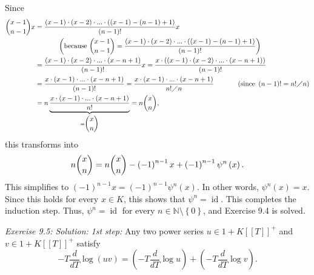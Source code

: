 \documentclass[numbers=enddot,12pt,final,onecolumn,notitlepage]{scrartcl}%
\begin{document}
Since%
\begin{align*}
\dbinom{x-1}{n-1}x  &  =\dfrac{\left(  x-1\right)  \cdot\left(  x-2\right)
\cdot...\cdot\left(  \left(  x-1\right)  -\left(  n-1\right)  +1\right)
}{\left(  n-1\right)  !}x\\
&  \ \ \ \ \ \ \ \ \ \ \left(  \text{because }\dbinom{x-1}{n-1}=\dfrac{\left(
x-1\right)  \cdot\left(  x-2\right)  \cdot...\cdot\left(  \left(  x-1\right)
-\left(  n-1\right)  +1\right)  }{\left(  n-1\right)  !}\right) \\
&  =\dfrac{\left(  x-1\right)  \cdot\left(  x-2\right)  \cdot...\cdot\left(
x-n+1\right)  }{\left(  n-1\right)  !}x=\dfrac{x\cdot\left(  \left(
x-1\right)  \cdot\left(  x-2\right)  \cdot...\cdot\left(  x-n+1\right)
\right)  }{\left(  n-1\right)  !}\\
&  =\dfrac{x\cdot\left(  x-1\right)  \cdot...\cdot\left(  x-n+1\right)
}{\left(  n-1\right)  !}=\dfrac{x\cdot\left(  x-1\right)  \cdot...\cdot\left(
x-n+1\right)  }{n!\diagup n}\ \ \ \ \ \ \ \ \ \ \left(  \text{since }\left(
n-1\right)  !=n!\diagup n\right) \\
&  =n\underbrace{\dfrac{x\cdot\left(  x-1\right)  \cdot...\cdot\left(
x-n+1\right)  }{n!}}_{=\dbinom{x}{n}}=n\dbinom{x}{n},
\end{align*}
this transforms into%
\[
n\dbinom{x}{n}=n\dbinom{x}{n}-\left(  -1\right)  ^{n-1}x+\left(  -1\right)
^{n-1}\psi^{n}\left(  x\right)  .
\]
This simplifies to $\left(  -1\right)  ^{n-1}x=\left(  -1\right)  ^{n-1}%
\psi^{n}\left(  x\right)  $. In other words, $\psi^{n}\left(  x\right)  =x$.
Since this holds for every $x\in K$, this shows that $\psi^{n}%
=\operatorname*{id}$. This completes the induction step. Thus, $\psi
^{n}=\operatorname*{id}$ for every $n\in\mathbb{N}\setminus\left\{  0\right\}
$, and Exercise 9.4 is solved.

\textit{Exercise 9.5: Solution:} \textit{1st step:} Any two power series
$u\in1+K\left[  \left[  T\right]  \right]  ^{+}$ and $v\in1+K\left[  \left[
T\right]  \right]  ^{+}$ satisfy%
\begin{equation}
-T\dfrac{d}{dT}\log\left(  uv\right)  =\left(  -T\dfrac{d}{dT}\log u\right)
+\left(  -T\dfrac{d}{dT}\log v\right)  . \label{9.ex5.s1}%
\end{equation}
\end{document}
